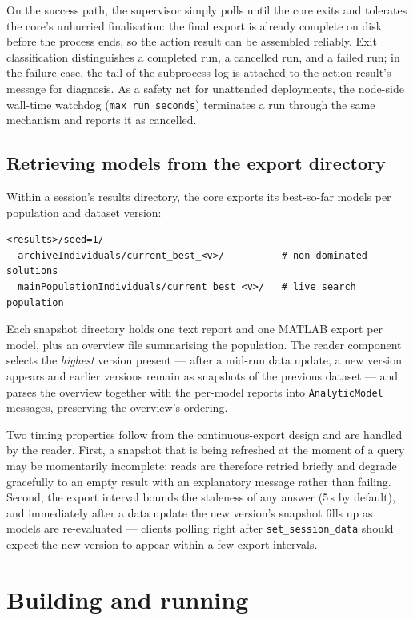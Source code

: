 On the success path, the supervisor simply polls until the core exits and
tolerates the core's unhurried finalisation: the final export is already
complete on disk before the process ends, so the action result can be
assembled reliably. Exit classification distinguishes a completed run, a
cancelled run, and a failed run; in the failure case, the tail of the
subprocess log is attached to the action result's message for diagnosis. As
a safety net for unattended deployments, the node-side wall-time watchdog
(\texttt{max\_run\_seconds}) terminates a run through the same mechanism and
reports it as cancelled.

\subsection{Retrieving models from the export directory}
\label{ros2:sec:mirror}

Within a session's results directory, the core exports its best-so-far
models per population and dataset version:

\begin{lstlisting}[style=ros2iface]
<results>/seed=1/
  archiveIndividuals/current_best_<v>/          # non-dominated solutions
  mainPopulationIndividuals/current_best_<v>/   # live search population
\end{lstlisting}

Each snapshot directory holds one text report and one MATLAB export per
model, plus an overview file summarising the population. The reader
component selects the \emph{highest} version present --- after a mid-run
data update, a new version appears and earlier versions remain as snapshots
of the previous dataset --- and parses the overview together with the
per-model reports into \texttt{AnalyticModel} messages, preserving the
overview's ordering.

Two timing properties follow from the continuous-export design and are
handled by the reader. First, a snapshot that is being refreshed at the
moment of a query may be momentarily incomplete; reads are therefore retried
briefly and degrade gracefully to an empty result with an explanatory
message rather than failing. Second, the export interval bounds the
staleness of any answer (5\,s by default), and immediately after a data
update the new version's snapshot fills up as models are re-evaluated ---
clients polling right after \texttt{set\_session\_data} should expect the
new version to appear within a few export intervals.

\section{Building and running}
\label{ros2:sec:usage}

